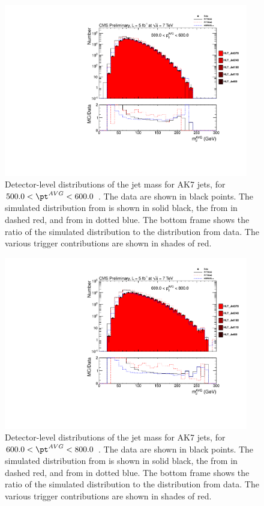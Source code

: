 \begin{figure}[htbp]
\centering
\includegraphics[width=0.95\textwidth]{figs/histAK7MjetVsPtAvg_rawDataMCComparisons_stacktrigs_pt_7}
\caption{Detector-level distributions of the jet mass for AK7 jets,
for $500.0 < \pt^{AVG} < 600.0$ \GeVc. The data are shown in black points.
The simulated distribution from \PYTHIA is shown in solid black, 
the from \PYTHIAEIGHT in dashed red, and from \HERWIG in dotted blue. 
The bottom frame shows the ratio of the simulated distribution
to the distribution from data. The various trigger contributions are shown in shades of red.
\label{figs:histAK7MjetVsPtAvg_rawDataMCComparisons_stacktrigs_pt_7}}
\end{figure}



\begin{figure}[htbp]
\centering
\includegraphics[width=0.95\textwidth]{figs/histAK7MjetVsPtAvg_rawDataMCComparisons_stacktrigs_pt_8}
\caption{Detector-level distributions of the jet mass for AK7 jets,
for $600.0 < \pt^{AVG} < 800.0$ \GeVc. The data are shown in black points.
The simulated distribution from \PYTHIA is shown in solid black, 
the from \PYTHIAEIGHT in dashed red, and from \HERWIG in dotted blue. 
The bottom frame shows the ratio of the simulated distribution
to the distribution from data. The various trigger contributions are shown in shades of red.
\label{figs:histAK7MjetVsPtAvg_rawDataMCComparisons_stacktrigs_pt_8}}
\end{figure}



